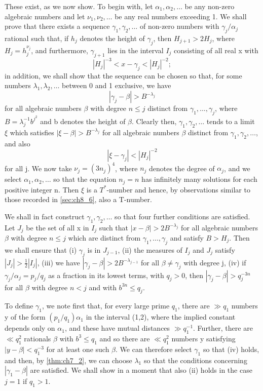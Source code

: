 These exist, as we now show. To begin with, let $\alpha_1, \alpha_2, \dots$ be any non-zero algebraic numbers and let $\nu_1, \nu_2, \dots$ be any real numbers exceeding 1. We shall prove that there exists a sequence $\gamma_1, \gamma_2, \dots$ of non-zero numbers with $\gamma_j/\alpha_j$ rational such that, if $h_j$ denotes the height of $\gamma_j$, then $H_{j+1} > 2H_j$, where $H_j = h_j^{\nu_j}$, and furthermore, $\gamma_{j+1}$ lies in the interval $I_j$ consisting of all real x with
\[|H_j|^{-3} < x - \gamma_j < |H_j|^{-2};\]
in addition, we shall show that the sequence can be chosen so that, for some numbers $\lambda_1, \lambda_2, \dots$ between 0 and 1 exclusive, we have
\[|\gamma_j-\beta| > B^{-\lambda_j}\]
for all algebraic numbers $\beta$ with degree $n \le j$ distinct from $\gamma_1, \dots, \gamma_j$, where $B = \lambda_j^{-1}b^{j^2}$ and b denotes the height of $\beta$. Clearly then, $\gamma_1, \gamma_2, \dots$ tends to a limit $\xi$ which satisfies $|\xi-\beta| > B^{-\lambda_j}$ for all algebraic numbers $\beta$ distinct from $\gamma_1, \gamma_2, \dots$, and also
\[|\xi-\gamma_j| < |H_j|^{-2}\]
for all j. We now take $\nu_j = (3n_j)^4$, where $n_j$ denotes the degree of $\alpha_j$, and we select $\alpha_1, \alpha_2, \dots$ so that the equation $n_j = n$ has infinitely many solutions for each positive integer n. Then $\xi$ is a $T^*$-number and hence, by observations similar to those recorded in \autoref{sec:ch8_6}, also a T-number.

We shall in fact construct $\gamma_1, \gamma_2, \dots$ so that four further conditions are satisfied. Let $J_j$ be the set of all x in $I_j$ such that $|x-\beta| > 2B^{-\lambda_j}$ for all algebraic numbers $\beta$ with degree $n \le j$ which are distinct from $\gamma_1, \dots, \gamma_j$ and satisfy $B > H_j$. Then we shall ensure that (i) $\gamma_j$ is in $J_{j-1}$, (ii) the measures of $I_j$ and $J_j$ satisfy $|J_j| > \frac{1}{2}|I_j|$, (iii) we have $|\gamma_j-\beta| > 2B^{-\lambda_{j-1}}$ for all $\beta \neq \gamma_j$ with degree j, (iv) if $\gamma_j/\alpha_j = p_j/q_j$ as a fraction in its lowest terms, with $q_j > 0$, then $|\gamma_j-\beta| > q_j^{-3n}$ for all $\beta$ with degree $n < j$ and with $b^{3n} \le q_j$.

To define $\gamma_1$, we note first that, for every large prime $q_1$, there are $\gg q_1$ numbers y of the form $(p_1/q_1)\alpha_1$ in the interval (1,2), where the implied constant depends only on $\alpha_1$, and these have mutual distances $\gg q_1^{-1}$. Further, there are $\ll q_1^2$ rationals $\beta$ with $b^3 \le q_1$ and so there are $\ll q_1^2$ numbers y satisfying $|y-\beta| < q_1^{-3}$ for at least one such $\beta$. We can therefore select $\gamma_1$ so that (iv) holds, and then, by \autoref{thm:ch7_2}, we can choose $\lambda_1$ so that the conditions concerning $|\gamma_1-\beta|$ are satisfied. We shall show in a moment that also (ii) holds in the case $j=1$ if $q_1 > 1$.

